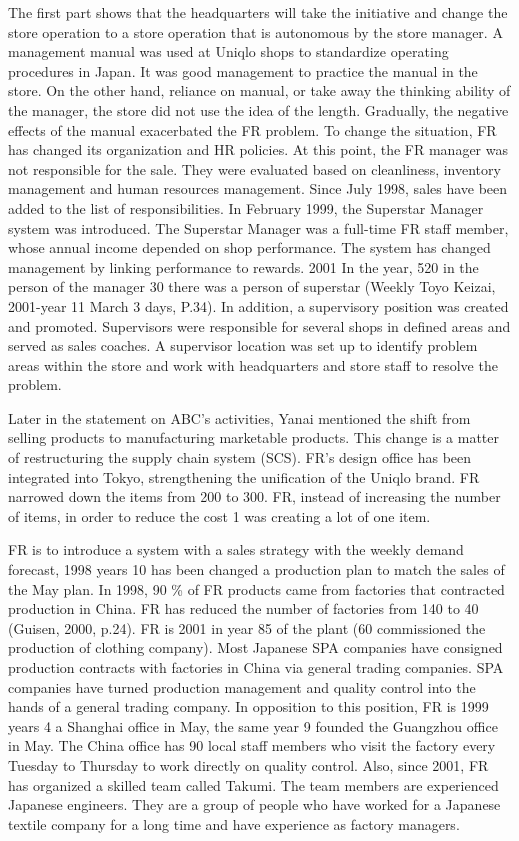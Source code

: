 \documentclass[12pt,a4paper]{article}
\begin{document}
The first part shows that the headquarters will take the initiative and
change the store operation to a store operation that is autonomous by
the store manager. A management manual was used at Uniqlo shops to
standardize operating procedures in Japan. It was good management to
practice the manual in the store. On the other hand, reliance on manual,
or take away the thinking ability of the manager, the store did not use
the idea of the length. Gradually, the negative effects of the manual
exacerbated the FR problem. To change the situation, FR has changed its
organization and HR policies. At this point, the FR manager was not
responsible for the sale. They were evaluated based on cleanliness,
inventory management and human resources management. Since July 1998,
sales have been added to the list of responsibilities. In February 1999,
the Superstar Manager system was introduced. The Superstar Manager was a
full-time FR staff member, whose annual income depended on shop
performance. The system has changed management by linking performance to
rewards. 2001 In the year, 520 in the person of the manager 30 there was
a person of superstar (Weekly Toyo Keizai, 2001-year 11 March 3 days,
P.34). In addition, a supervisory position was created and promoted.
Supervisors were responsible for several shops in defined areas and
served as sales coaches. A supervisor location was set up to identify
problem areas within the store and work with headquarters and store
staff to resolve the problem.

Later in the statement on ABC's activities, Yanai mentioned the shift
from selling products to manufacturing marketable products. This change
is a matter of restructuring the supply chain system (SCS). FR's design
office has been integrated into Tokyo, strengthening the unification of
the Uniqlo brand. FR narrowed down the items from 200 to 300. FR,
instead of increasing the number of items, in order to reduce the cost 1
was creating a lot of one item.

FR is to introduce a system with a sales strategy with the weekly demand
forecast, 1998 years 10 has been changed a production plan to match the
sales of the May plan. In 1998, 90 \% of FR products came from factories
that contracted production in China. FR has reduced the number of
factories from 140 to 40 (Guisen, 2000, p.24). FR is 2001 in year 85 of
the plant (60 commissioned the production of clothing company). Most
Japanese SPA companies have consigned production contracts with
factories in China via general trading companies. SPA companies have
turned production management and quality control into the hands of a
general trading company. In opposition to this position, FR is 1999
years 4 a Shanghai office in May, the same year 9 founded the Guangzhou
office in May. The China office has 90 local staff members who visit the
factory every Tuesday to Thursday to work directly on quality control.
Also, since 2001, FR has organized a skilled team called Takumi. The
team members are experienced Japanese engineers. They are a group of
people who have worked for a Japanese textile company for a long time
and have experience as factory managers.
\end{document}
